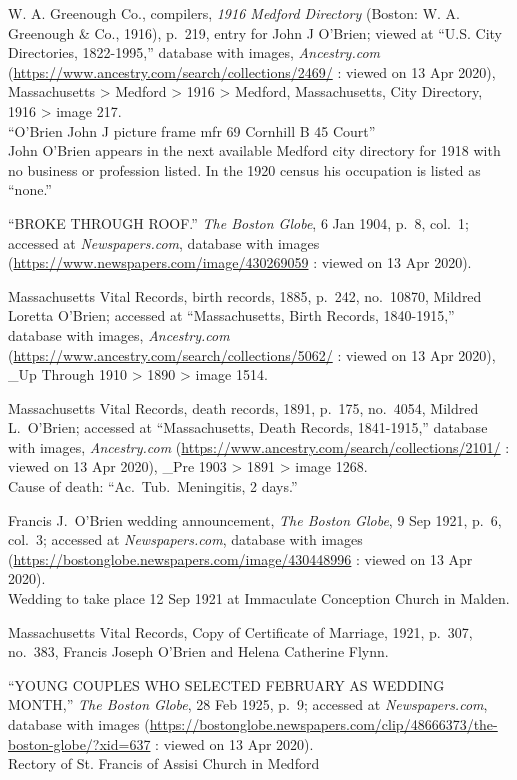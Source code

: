 \begin{thebibliography}{999}
	W. A. Greenough Co., compilers, \textit{1916 Medford Directory} (Boston: W. A. Greenough \& Co., 1916), p.\ 219, entry for John J O'Brien; viewed at ``U.S. City Directories, 1822-1995,'' database with images, \textit{Ancestry.com} (\url{https://www.ancestry.com/search/collections/2469/} : viewed on 13 Apr 2020), Massachusetts > Medford > 1916 > Medford, Massachusetts, City Directory, 1916 > image 217.\\
	``O'Brien John J picture frame mfr 69 Cornhill B 45 Court''\\
	John O'Brien appears in the next available Medford city directory for 1918 with no business or profession listed. In the 1920 census his occupation is listed as ``none.''
	
	``BROKE THROUGH ROOF.'' \textit{The Boston Globe}, 6 Jan 1904, p.\ 8, col.\ 1; accessed at \textit{Newspapers.com}, database with images (\url{https://www.newspapers.com/image/430269059} : viewed on 13 Apr 2020).
	
	Massachusetts Vital Records, birth records, 1885, p.\ 242, no.\ 10870, Mildred Loretta O'Brien; accessed at ``Massachusetts, Birth Records, 1840-1915,'' database with images, \textit{Ancestry.com} (\url{https://www.ancestry.com/search/collections/5062/} : viewed on 13 Apr 2020), \_Up Through 1910 > 1890 > image 1514.
	
	Massachusetts Vital Records, death records, 1891, p.\ 175, no.\ 4054, Mildred L.\ O'Brien; accessed at ``Massachusetts, Death Records, 1841-1915,'' database with images, \textit{Ancestry.com} (\url{https://www.ancestry.com/search/collections/2101/} : viewed on 13 Apr 2020), \_Pre 1903 > 1891 > image 1268.\\
	Cause of death: ``Ac.\ Tub.\ Meningitis, 2 days.''
	
	Francis J.\ O'Brien wedding announcement, \textit{The Boston Globe}, 9 Sep 1921, p.\ 6, col.\ 3; accessed at \textit{Newspapers.com}, database with images (\url{https://bostonglobe.newspapers.com/image/430448996} : viewed on 13 Apr 2020).\\
	Wedding to take place 12 Sep 1921 at Immaculate Conception Church in Malden.
	
	Massachusetts Vital Records, Copy of Certificate of Marriage, 1921, p.\ 307, no.\ 383, Francis Joseph O'Brien and Helena Catherine Flynn.
	
	``YOUNG COUPLES WHO SELECTED FEBRUARY AS WEDDING MONTH,'' \textit{The Boston Globe}, 28 Feb 1925, p.\ 9; accessed at \textit{Newspapers.com}, database with images (\url{https://bostonglobe.newspapers.com/clip/48666373/the-boston-globe/?xid=637} : viewed on 13 Apr 2020).\\
	Rectory of St. Francis of Assisi Church in Medford
	

\end{thebibliography}
